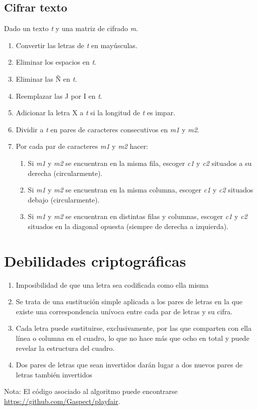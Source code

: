 \documentclass{article}
\begin{document}
    \subsection{Cifrar texto}
    Dado un texto \textit{t} y una matriz de cifrado \textit{m}.
    \begin{enumerate}
        \item Convertir las letras de  \textit{t} en mayúsculas.
        \item Eliminar los espacios en \textit{t}.
        \item Eliminar las Ñ en \textit{t}.
        \item Reemplazar las J por I en \textit{t}.
        \item Adicionar la letra X a \textit{t} si la longitud de \textit{t} es impar.
        \item Dividir a \textit{t} en pares de caracteres consecutivos en \textit{m1} y  \textit{m2}.
        \item Por cada par de caracteres \textit{m1} y \textit{m2} hacer:
            \begin{enumerate}
                \item Si \textit{m1} y \textit{m2} se encuentran en la misma fila, escoger \textit{c1} y \textit{c2} situados a su derecha (circularmente).
                \item Si \textit{m1} y \textit{m2} se encuentran en la misma columna, escoger \textit{c1} y \textit{c2} situados debajo (circularmente).
                \item Si \textit{m1} y \textit{m2} se encuentran en distintas filas y columnas, escoger \textit{c1} y \textit{c2} situados en la diagonal opuesta (siempre de derecha a izquierda).
            \end{enumerate}
    \end{enumerate}
    \section{Debilidades criptográficas}
    \begin{enumerate}
        \item Imposibilidad de que una letra sea codificada como ella misma
        \item Se trata de una sustitución simple aplicada a los pares de letras en la que existe una correspondencia unívoca entre cada par de letras y su cifra.
        \item Cada letra puede sustituirse, exclusivamente, por las que comparten con ella línea o columna en el cuadro, lo que no hace más que ocho en total y puede revelar la estructura del cuadro.
        \item Dos pares de letras que sean invertidos darán lugar a dos nuevos pares de letras también invertidos
    \end{enumerate}


    Nota: El código asociado al algoritmo puede encontrarse \href{aquí}{https://github.com/Gaspect/playfair}. 
\end{document}
